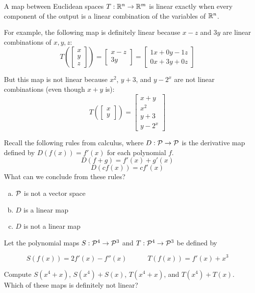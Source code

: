 \begin{fact}
A map between Euclidean spaces \(T:\IR^n\to\IR^m\) is linear
exactly when every component of the output is a linear combination
of the variables of \(\IR^n\).

\vspace{1em}

For example, the following map is definitely linear
because \(x-z\) and \(3y\) are linear combinations of \(x,y,z\):
\[
  T\left(\begin{bmatrix} x \\ y \\ z \end{bmatrix} \right)
=
  \begin{bmatrix} x-z \\ 3y \end{bmatrix}
=
  \begin{bmatrix} 1x+0y-1z \\ 0x+3y+0z \end{bmatrix}
\]

But this map is not linear because \(x^2\), \(y+3\), and \(y-2^x\)
are not linear combinations (even though \(x+y\) is):
\[
  T\left(\begin{bmatrix} x \\ y \end{bmatrix} \right)
=
  \begin{bmatrix} x+y \\ x^2 \\ y+3 \\ y-2^x \end{bmatrix}
\]
\end{fact}

\begin{activity}{5}
  Recall the following rules from calculus, where \(D:\P\to\P\)
  is the derivative map defined by \(D(f(x))=f'(x)\) for each
  polynomial \(f\).
  \[
    D(f+g)=f'(x)+g'(x)
  \]
  \[
    D(cf(x))=cf'(x)
  \]
  What can we conclude from these rules?
  \begin{enumerate}[a)]
    \item \(\P\) is not a vector space
    \item \(D\) is a linear map
    \item \(D\) is not a linear map
  \end{enumerate}
\end{activity}


\begin{activity}{10}
Let the polynomial maps \(S: \P^4 \rightarrow \P^3\)
and \(T: \P^4 \rightarrow \P^3\) be defined by

\[S(f(x)) = 2f'(x)-f''(x) \hspace{3em} T(f(x)) = f'(x)+x^3\]

Compute \(S(x^4+x)\), \(S(x^4)+S(x)\), \(T(x^4+x)\), and \(T(x^4)+T(x)\).
Which of these maps is definitely not linear?
\end{activity}


